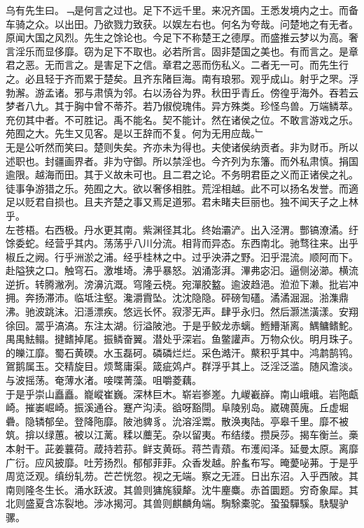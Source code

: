 \documentclass{zhvt-classic}
\begin{document}
\hspace*{2em}乌有先生曰。﹁是何言之过也。足下不远千里。来况齐国。王悉发境内之士。而备车骑之众。以出田。乃欲戮力致获。以娱左右也。何名为夸哉。问楚地之有无者。原闻大国之风烈。先生之馀论也。今足下不称楚王之德厚。而盛推云梦以为高。奢言淫乐而显侈靡。窃为足下不取也。必若所言。固非楚国之美也。有而言之。是章君之恶。无而言之。是害足下之信。章君之恶而伤私义。二者无一可。而先生行之。必且轻于齐而累于楚矣。且齐东陼巨海。南有琅邪。观乎成山。射乎之罘。浮勃澥。游孟诸。邪与肃慎为邻。右以汤谷为界。秋田乎青丘。傍徨乎海外。吞若云梦者八九。其于胸中曾不蒂芥。若乃俶傥瑰伟。异方殊类。珍怪鸟兽。万端鳞萃。充仞其中者。不可胜记。禹不能名。契不能计。然在诸侯之位。不敢言游戏之乐。苑囿之大。先生又见客。是以王辞而不复。何为无用应哉。﹂\\
\hspace*{2em}无是公听然而笑曰。楚则失矣。齐亦未为得也。夫使诸侯纳贡者。非为财币。所以述职也。封疆画界者。非为守御。所以禁淫也。今齐列为东籓。而外私肃慎。捐国逾限。越海而田。其于义故未可也。且二君之论。不务明君臣之义而正诸侯之礼。徒事争游猎之乐。苑囿之大。欲以奢侈相胜。荒淫相越。此不可以扬名发誉。而適足以贬君自损也。且夫齐楚之事又焉足道邪。君未睹夫巨丽也。独不闻天子之上林乎。\\
\hspace*{2em}左苍梧。右西极。丹水更其南。紫渊径其北。终始灞浐。出入泾渭。酆镐潦潏。纡馀委蛇。经营乎其内。荡荡乎八川分流。相背而异态。东西南北。驰骛往来。出乎椒丘之阙。行乎洲淤之浦。经乎桂林之中。过乎泱漭之野。汩乎混流。顺阿而下。赴隘狭之口。触穹石。激堆埼。沸乎暴怒。汹涌澎湃。滭弗宓汩。逼侧泌瀄。横流逆折。转腾潎冽。滂濞沆溉。穹隆云桡。宛潬胶盭。逾波趋浥。涖涖下濑。批岩冲拥。奔扬滞沛。临坻注壑。瀺灂霣坠。沈沈隐隐。砰磅訇礚。潏潏淈淈。湁潗鼎沸。驰波跳沫。汩濦漂疾。悠远长怀。寂漻无声。肆乎永归。然后灏溔潢漾。安翔徐回。翯乎滈滈。东注太湖。衍溢陂池。于是乎鲛龙赤螭。䱭䲛渐离。鰅鳙鳍鮀。禺禺魼鳎。揵鳍掉尾。振鳞奋翼。潜处乎深岩。鱼鳖讙声。万物众伙。明月珠子。的皪江靡。蜀石黄碝。水玉磊砢。磷磷烂烂。采色澔汗。藂积乎其中。鸿鹔鹄鸨。鴐鹅属玉。交精旋目。烦鹜庸渠。箴疵䴔卢。群浮乎其上。泛淫泛滥。随风澹淡。与波摇荡。奄薄水渚。唼喋菁藻。咀嚼菱藕。\\
\hspace*{2em}于是乎崇山矗矗。巃嵷崔巍。深林巨木。崭岩㟥嵳。九嵕嶻嶭。南山峨峨。岩陁甗崎。摧崣崛崎。振溪通谷。蹇产沟渎。谽呀豁閕。阜陵别岛。崴磈葨廆。丘虚堀礨。隐辚郁垒。登降陁靡。陂池貏豸。沇溶淫鬻。散涣夷陆。亭皋千里。靡不被筑。揜以绿蕙。被以江蓠。糅以蘪芜。杂以留夷。布结缕。攒戾莎。揭车衡兰。槀本射干。茈姜蘘荷。葴持若荪。鲜支黄砾。蒋苎青薠。布濩闳泽。延曼太原。离靡广衍。应风披靡。吐芳扬烈。郁郁菲菲。众香发越。肸蚃布写。晻薆咇茀。于是乎周览泛观。缜纷轧芴。芒芒恍忽。视之无端。察之无涯。日出东沼。入乎西陂。其南则隆冬生长。涌水跃波。其兽则㺎旄貘犛。沈牛麈麋。赤首圜题。穷奇象犀。其北则盛夏含冻裂地。涉冰揭河。其兽则麒麟角端。騊駼橐驼。蛩蛩驒騱。駃騠驴骡。\\
\end{document}
